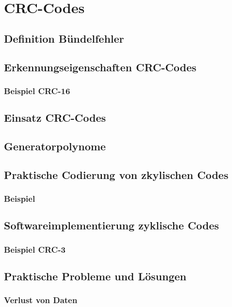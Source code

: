 \section{CRC-Codes}
\subsection{Definition Bündelfehler}
\subsection{Erkennungseigenschaften CRC-Codes}
\subsubsection*{Beispiel CRC-16}
\subsection{Einsatz CRC-Codes}
\subsection{Generatorpolynome}

\subsection{Praktische Codierung von zkylischen Codes}
\subsubsection*{Beispiel}
\subsection{Softwareimplementierung zyklische Codes}
\subsubsection{Beispiel CRC-3}
\subsection{Praktische Probleme und Lösungen}
\subsubsection{Verlust von Daten}
